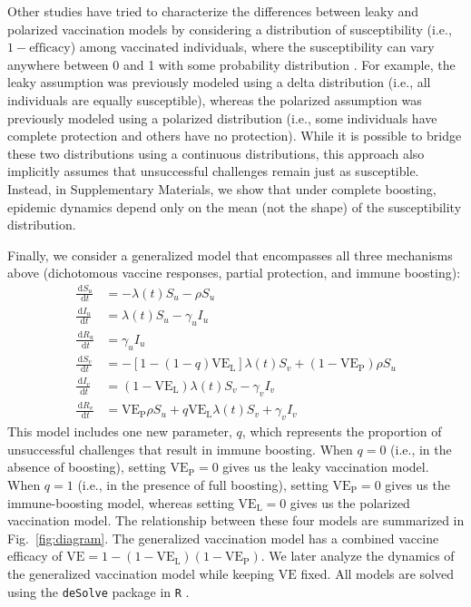 \documentclass[12pt]{article}
\newcommand{\fref}[1]{Fig.~\ref{fig:#1}}
\newcommand{\dd}[1]{\ensuremath{\, \mathrm{d}#1}}
\newcommand{\VE}{\ensuremath{\mathrm{VE}}}
\newcommand{\VEP}{\ensuremath{\VE_{\mathrm{P}}}}
\newcommand{\VEL}{\ensuremath{\VE_{\mathrm{L}}}}
\begin{document}
Other studies have tried to characterize the differences between leaky and polarized vaccination models by considering a distribution of susceptibility (i.e., $1-\mathrm{efficacy}$) among vaccinated individuals, where the susceptibility can vary anywhere between 0 and 1 with some probability distribution \citep{gomes2014missing}.
For example, the leaky assumption was previously modeled using a delta distribution (i.e., all individuals are equally susceptible), whereas the polarized assumption was previously modeled using a polarized distribution (i.e., some individuals have complete protection and others have no protection). 
While it is possible to bridge these two distributions using a continuous distributions, this approach also implicitly assumes that unsuccessful challenges remain just as susceptible.
Instead, in Supplementary Materials, we show that under complete boosting, epidemic dynamics depend only on the mean (not the shape) of the susceptibility distribution.

Finally, we consider a generalized model that encompasses all three mechanisms above (dichotomous vaccine responses, partial protection, and immune boosting):
\begin{align}
\frac{\dd S_u}{\dd t} &= - \lambda(t) S_u - \rho S_u \\
\frac{\dd I_u}{\dd t} &= \lambda(t) S_u - \gamma_u I_u \\
\frac{\dd R_u}{\dd t} &= \gamma_u I_u \\
\frac{\dd S_v}{\dd t} &= - [1- (1-q) \VEL] \lambda(t) S_v + (1-\VEP) \rho S_u \\
\frac{\dd I_v}{\dd t} &= (1-\VEL) \lambda(t) S_v - \gamma_v I_v \\
\frac{\dd R_v}{\dd t} &= \VEP \rho S_u + q \VEL \lambda(t) S_v + \gamma_v I_v
\end{align}
This model includes one new parameter, $q$, which represents the proportion of unsuccessful challenges that result in immune boosting.
When $q=0$ (i.e., in the absence of boosting), setting $\VEP = 0$ gives us the leaky vaccination model. 
When $q=1$ (i.e., in the presence of full boosting), setting $\VEP = 0$ gives us the immune-boosting model, whereas setting $\VEL = 0$ gives us the polarized vaccination model. 
The relationship between these four models are summarized in \fref{diagram}.
The generalized vaccination model has a combined vaccine efficacy of $\VE = 1- (1-\VEL) (1-\VEP)$.
We later analyze the dynamics of the generalized vaccination model while keeping $\VE$ fixed.
All models are solved using the \texttt{deSolve} package \citep{soetaert2010solving} in \texttt{R} \citep{Rlang}.
\end{document}
